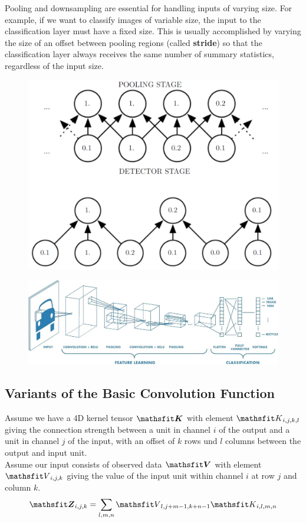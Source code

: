 \begin{multicols}{2}
\begin{figure}[H]
	\end{figure}
	Pooling and downsampling are essential for handling inputs of varying size.
	For example, if we want to classify images of variable size, the input to the classification layer must have a fixed size.
	This is usually accomplished by varying the size of an offset between pooling regions (called \textbf{stride}) so that the classification layer always receives the same number of summary statistics, regardless of the input size.
	\begin{figure}[H]
		\centering
		\includegraphics[width=0.8\linewidth]{images/stride.PNG}
	\end{figure}
	\begin{figure}[H]
		\centering
		\includegraphics[width=0.9\linewidth]{images/cnn_arch.jpg}
	\end{figure}
	\newpage
	\subsection{Variants of the Basic Convolution Function}
	Assume we have a 4D kernel tensor $\tK$ with element $\etK_{i,j,k,l}$ giving the connection strength between a unit in channel $i$ of the output and a unit in channel $j$ of the input, with an offset of $k$ rows und $l$ columns between the output and input unit.\\
	Assume our input consists of observed data $\tV$ with element $\etV_{i,j,k}$ giving the value of the input unit within channel $i$ at row $j$ and column $k$.
	\[ \tZ_{i,j,k} = \sum_{l,m,n} \etV_{l,j+m-1,k+n-1} \etK_{i,l,m,n} \]


\end{multicols}
